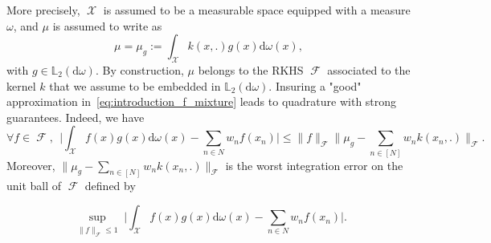 \documentclass[twoside,11pt]{book}
\numberwithin{theorem}{chapter}
\numberwithin{definition}{chapter}
\numberwithin{proposition}{chapter}
\numberwithin{corollary}{chapter}
\numberwithin{example}{chapter}
\numberwithin{lemma}{chapter}
\numberwithin{assumption}{chapter}
\numberwithin{equation}{chapter}
\numberwithin{figure}{chapter}
\DeclareMathOperator{\F}{\mathcal{F}}
\DeclareMathOperator{\X}{\mathcal{X}}
\begin{document}
More precisely, $\X$ is assumed to be a measurable space equipped with a measure $\omega$, and $\mu$ is assumed to write as
\begin{equation}
\mu = \mu_{g} := \int_{\X}k(x,.)g(x) \mathrm{d}\omega(x),
\end{equation}
with $g \in \mathbb{L}_{2}(\mathrm{d}\omega)$. By construction, $\mu$ belongs to the RKHS $\F$ associated to the kernel $k$ that we assume to be embedded in $\mathbb{L}_{2}(\mathrm{d}\omega)$. Insuring a "good" approximation in~\eqref{eq:introduction_f_mixture} leads to quadrature with strong guarantees. Indeed, we have
\begin{equation}
\forall f \in \F, \:\: \Big| \int_{\X} f(x)g(x)\mathrm{d}\omega(x) - \sum\limits_{n \in N}w_{n}f(x_{n})  \Big| \leq \|f\|_{\F} \Big\|\mu_{g} - \sum\limits_{n \in [N]} w_{n}k(x_{n},.) \Big\|_{\F}.
\end{equation}
Moreover, $\|\mu_{g} - \sum_{n \in [N]} w_{n}k(x_{n},.) \|_{\F}$ is the worst integration error on the unit ball of $\F$ defined by

\begin{equation}
\sup\limits_{\substack{\|f\|_{\F} \leq 1}} \Big| \int_{\X} f(x)g(x)\mathrm{d}\omega(x) - \sum_{n \in N}w_{n}f(x_{n}) \Big|.
\end{equation}

\end{document}
